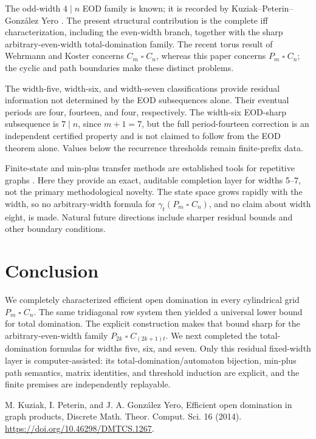 \documentclass[11pt]{article}
\theoremstyle{definition}
\newcommand{\gt}{\gamma_t}
\newcommand{\sq}{\mathbin{\square}}
\begin{document}
The odd-width \(4\mid n\) EOD family is known; it is recorded by
Kuziak--Peterin--González Yero \cite{KuziakPeterinGonzalezYero2014}. The present
structural contribution is the complete iff characterization, including the
even-width branch, together with the sharp arbitrary-even-width
total-domination family. The recent torus result of Wehrmann and Koster
\cite{WehrmannKoster2026} concerns \(C_m\sq C_n\), whereas this paper
concerns \(P_m\sq C_n\); the cyclic and path boundaries make these distinct
problems.

The width-five, width-six, and width-seven classifications provide residual
information not determined by the EOD subsequences alone. Their eventual
periods are four, fourteen, and four, respectively. The width-six EOD-sharp
subsequence is \(7\mid n\), since \(m+1=7\), but the full period-fourteen
correction is an independent certified property and is not claimed to follow
from the EOD theorem alone. Values below the recurrence thresholds remain
finite-prefix data.

Finite-state and min-plus transfer methods are established tools for
repetitive graphs \cite{KlavzarZerovnik1996,BouznifMoncelPreissmann2016}.
Here they provide an exact, auditable completion layer for widths 5--7, not
the primary methodological novelty. The state space grows rapidly with the
width, so no arbitrary-width formula for \(\gt(P_m\sq C_n)\), and no claim
about width eight, is made. Natural future directions include sharper
residual bounds and other boundary conditions.

\section{Conclusion}

We completely characterized efficient open domination in every cylindrical
grid \(P_m\sq C_n\). The same tridiagonal row system then yielded a universal
lower bound for total domination. The explicit construction makes that bound
sharp for the arbitrary-even-width family
\(P_{2k}\sq C_{(2k+1)t}\). We next completed the total-domination formulas
for widths five, six, and seven. Only this residual fixed-width layer is
computer-assisted: its total-domination/automaton bijection, min-plus path
semantics, matrix identities, and threshold induction are explicit, and the
finite premises are independently replayable.



\iffalse
{}
M. Kuziak, I. Peterin, and J. A. González Yero, Efficient open domination
in graph products, Discrete Math. Theor. Comput. Sci. 16 (2014).
\url{https://doi.org/10.46298/DMTCS.1267}.
\end{document}
